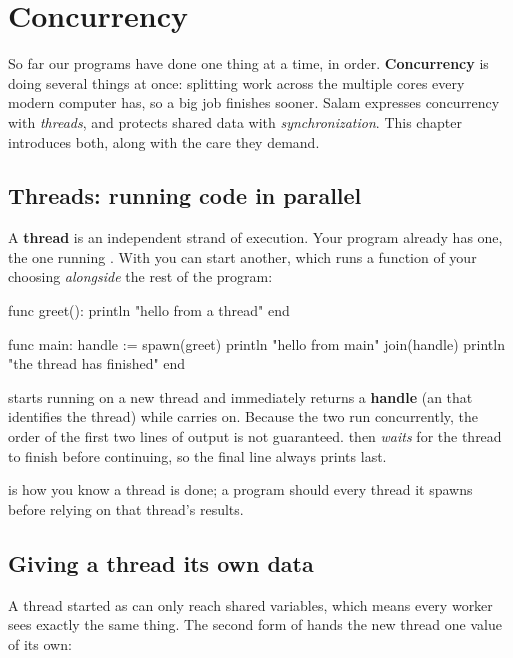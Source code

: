\chapter{Concurrency}%
\label{ch:concurrency}

So far our programs have done one thing at a time, in order. \textbf{Concurrency}
is doing several things at once: splitting work across the multiple cores every
modern computer has, so a big job finishes sooner. Salam expresses concurrency
with \emph{threads}, and protects shared data with \emph{synchronization}. This
chapter introduces both, along with the care they demand.

\section{Threads: running code in parallel}

A \textbf{thread} is an independent strand of execution. Your program already has
one, the one running . With  you can start another, which
runs a function of your choosing \emph{alongside} the rest of the program:

\begin{salamen}
func greet():
    println "hello from a thread"
end

func main:
    handle := spawn(greet)
    println "hello from main"
    join(handle)
    println "the thread has finished"
end
\end{salamen}

 starts  running on a new thread and immediately
returns a \textbf{handle} (an  that identifies the thread) while
 carries on. Because the two run concurrently, the order of the first
two lines of output is not guaranteed.  then \emph{waits} for
the thread to finish before continuing, so the final line always prints last.

\begin{note}
 is how you know a thread is done; a program should  every
thread it spawns before relying on that thread's results.
\end{note}

\section{Giving a thread its own data}

A thread started as  can only reach shared variables, which
means every worker sees exactly the same thing. The second form of 
hands the new thread one value of its own:

